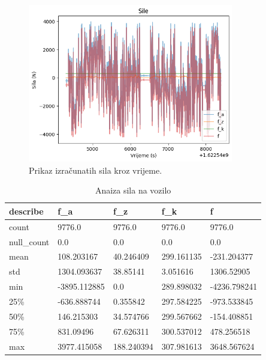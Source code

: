 \begin{figure}
    \centering
    \includegraphics[width=0.8\textwidth]{images/forces.png}
    \caption{Prikaz izračunatih sila kroz vrijeme.}
    \label{fig:c:force_graph}
\end{figure}

\begin{table}[!ht]
    \centering
    \caption{Anaiza sila na vozilo}
    \begin{tabular}{lllll}
    \hline
        \textbf{describe} & \textbf{f\_a} & \textbf{f\_z} & \textbf{f\_k} & \textbf{f} \\ \hline
        count & 9776.0 & 9776.0 & 9776.0 & 9776.0 \\ 
        null\_count & 0.0 & 0.0 & 0.0 & 0.0 \\ 
        mean & 108.203167 & 40.246409 & 299.161135 & -231.204377 \\ 
        std & 1304.093637 & 38.85141 & 3.051616 & 1306.52905 \\ 
        min & -3895.112885 & 0.0 & 289.898032 & -4236.798241 \\ 
        25\% & -636.888744 & 0.355842 & 297.584225 & -973.533845 \\ 
        50\% & 146.215303 & 34.574766 & 299.567662 & -154.408851 \\ 
        75\% & 831.09496 & 67.626311 & 300.537012 & 478.256518 \\ 
        max & 3977.415058 & 188.240394 & 307.981613 & 3648.567624 \\ \hline
    \end{tabular}
    \label{table:c:forces}
\end{table}